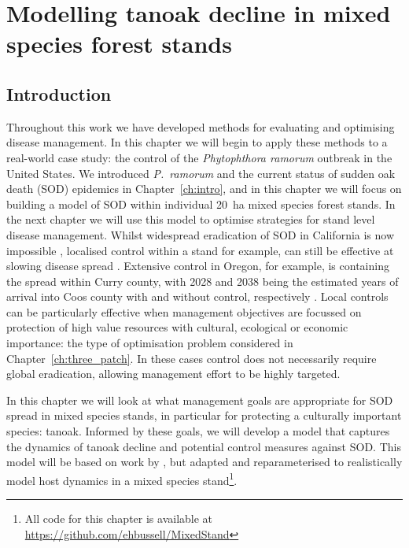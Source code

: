 %
\chapter{Modelling tanoak decline in mixed species forest stands\label{ch:protect_tanoak_model}}

\section{Introduction\label{sec:ch5:Intro}}

Throughout this work we have developed methods for evaluating and optimising disease management. In this chapter we will begin to apply these methods to a real-world case study: the control of the \textit{Phytophthora ramorum} outbreak in the United States. We introduced \textit{P.~ramorum} and the current status of sudden oak death (SOD) epidemics in Chapter~\ref{ch:intro}, and in this chapter we will focus on building a model of SOD within individual \SI{20}{\hectare} mixed species forest stands. In the next chapter we will use this model to optimise strategies for stand level disease management. Whilst widespread eradication of SOD in California is now impossible \citep{cunniffe_modelling_2016}, localised control within a stand for example, can still be effective at slowing disease spread \citep{hansen_efficacy_2019}. Extensive control in Oregon, for example, is containing the spread within Curry county, with 2028 and 2038 being the estimated years of arrival into Coos county with and without control, respectively \citep{sod_economics_assessment}. Local controls can be particularly effective when management objectives are focussed on protection of high value resources with cultural, ecological or economic importance: the type of optimisation problem considered in Chapter~\ref{ch:three_patch}. In these cases control does not necessarily require global eradication, allowing management effort to be highly targeted.

In this chapter we will look at what management goals are appropriate for SOD spread in mixed species stands, in particular for protecting a culturally important species: tanoak. Informed by these goals, we will develop a model that captures the dynamics of tanoak decline and potential control measures against SOD\@. This model will be based on work by \citet{cobb_ecosystem_2012}, but adapted and reparameterised to realistically model host dynamics in a mixed species stand\footnote{All code for this chapter is available at \url{https://github.com/ehbussell/MixedStand}}.

